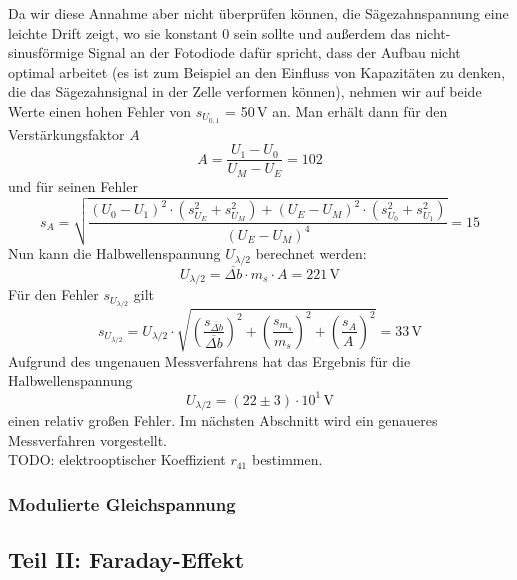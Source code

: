 Da wir diese Annahme aber nicht überprüfen können,
die Sägezahnspannung eine leichte Drift zeigt, wo sie konstant 0 sein sollte
und außerdem das nicht-sinusförmige
Signal an der Fotodiode dafür spricht, dass der Aufbau nicht optimal arbeitet
(es ist zum Beispiel an den Einfluss von Kapazitäten zu denken,
die das Sägezahnsignal in der Zelle verformen können),
nehmen wir auf beide Werte einen hohen Fehler von $s_{U_{0,1}}$ = 50\,V an.
Man erhält dann für den Verstärkungsfaktor $A$
\begin{equation}
  A=\frac{U_1-U_0}{U_M-U_E}=102
\end{equation}
und für seinen Fehler
\begin{equation}
  s_A=\sqrt{\frac{(U_0-U_1)^2 \cdot \left(s_{U_E}^2+s_{U_M}^2\right)+(U_E-U_M)^2 \cdot \left(s_{U_0}^2+s_{U_1}^2\right)}{(U_E-U_M)^4}}
  =15
\end{equation}
Nun kann die Halbwellenspannung $U_{\lambda / 2}$ berechnet werden:
\begin{equation}
  U_{\lambda / 2}  = \overline{\Delta b} \cdot m_s \cdot A = 221\,\text{V}
\end{equation}
Für den Fehler $s_{U_{\lambda / 2}}$ gilt
\begin{equation}
  s_{U_{\lambda / 2}} = U_{\lambda / 2} \cdot \sqrt{\left(\frac{s_{\overline{\Delta b}}}{\overline{\Delta b}}\right)^2+\left(\frac{s_{m_s}}{m_s}\right)^2+\left(\frac{s_{A}}{A_{\,}}\right)^2}
  = 33 \,\text{V}
\end{equation}
Aufgrund des ungenauen Messverfahrens hat das Ergebnis für die Halbwellenspannung
\begin{equation}
  U_{\lambda / 2}  = (22 \pm 3) \cdot 10^1\,\text{V}
\end{equation}
einen relativ großen Fehler. %
Im nächsten Abschnitt wird ein genaueres Messverfahren vorgestellt.
\\ TODO: elektrooptischer Koeffizient $r_{41}$ bestimmen.

\subsubsection{Modulierte Gleichspannung}

\subsection{Teil II: Faraday-Effekt}
